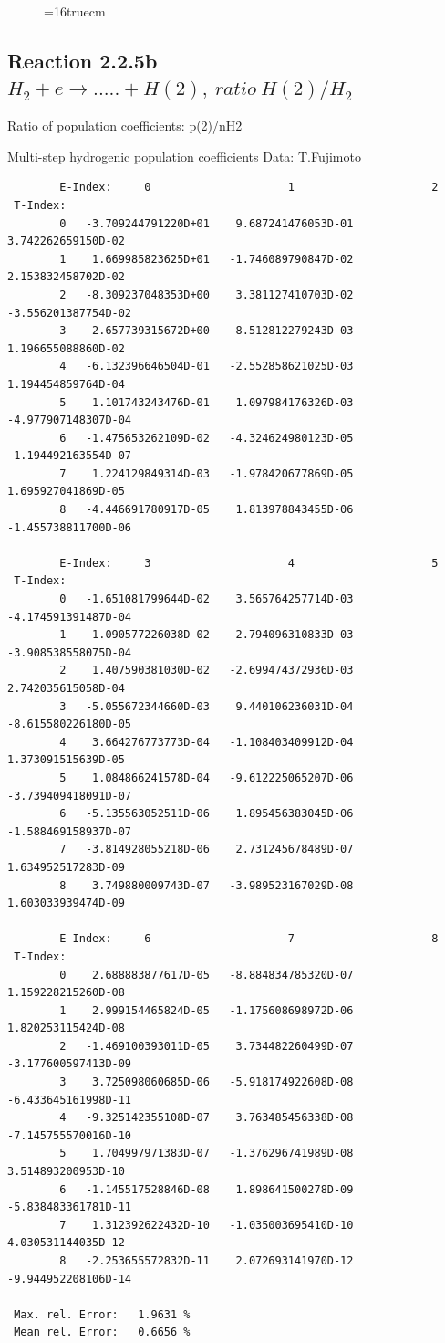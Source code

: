 \documentclass[12pt,dvips]{article}
\begin{document}
\begin{figure} \label{2.2.5a}
\epsfxsize=16truecm
\end{figure}
\newpage
\subsection{
Reaction 2.2.5b  $H_2 + e \rightarrow .....+H(2)   , \  ratio ~ H(2)/H_2 $
}

 Ratio of population coefficients: p(2)/nH2

 Multi-step hydrogenic population coefficients
 Data: T.Fujimoto


\begin{small}\begin{verbatim}
        E-Index:     0                     1                     2
 T-Index:
        0   -3.709244791220D+01    9.687241476053D-01    3.742262659150D-02
        1    1.669985823625D+01   -1.746089790847D-02    2.153832458702D-02
        2   -8.309237048353D+00    3.381127410703D-02   -3.556201387754D-02
        3    2.657739315672D+00   -8.512812279243D-03    1.196655088860D-02
        4   -6.132396646504D-01   -2.552858621025D-03    1.194454859764D-04
        5    1.101743243476D-01    1.097984176326D-03   -4.977907148307D-04
        6   -1.475653262109D-02   -4.324624980123D-05   -1.194492163554D-07
        7    1.224129849314D-03   -1.978420677869D-05    1.695927041869D-05
        8   -4.446691780917D-05    1.813978843455D-06   -1.455738811700D-06

        E-Index:     3                     4                     5
 T-Index:
        0   -1.651081799644D-02    3.565764257714D-03   -4.174591391487D-04
        1   -1.090577226038D-02    2.794096310833D-03   -3.908538558075D-04
        2    1.407590381030D-02   -2.699474372936D-03    2.742035615058D-04
        3   -5.055672344660D-03    9.440106236031D-04   -8.615580226180D-05
        4    3.664276773773D-04   -1.108403409912D-04    1.373091515639D-05
        5    1.084866241578D-04   -9.612225065207D-06   -3.739409418091D-07
        6   -5.135563052511D-06    1.895456383045D-06   -1.588469158937D-07
        7   -3.814928055218D-06    2.731245678489D-07    1.634952517283D-09
        8    3.749880009743D-07   -3.989523167029D-08    1.603033939474D-09

        E-Index:     6                     7                     8
 T-Index:
        0    2.688883877617D-05   -8.884834785320D-07    1.159228215260D-08
        1    2.999154465824D-05   -1.175608698972D-06    1.820253115424D-08
        2   -1.469100393011D-05    3.734482260499D-07   -3.177600597413D-09
        3    3.725098060685D-06   -5.918174922608D-08   -6.433645161998D-11
        4   -9.325142355108D-07    3.763485456338D-08   -7.145755570016D-10
        5    1.704997971383D-07   -1.376296741989D-08    3.514893200953D-10
        6   -1.145517528846D-08    1.898641500278D-09   -5.838483361781D-11
        7    1.312392622432D-10   -1.035003695410D-10    4.030531144035D-12
        8   -2.253655572832D-11    2.072693141970D-12   -9.944952208106D-14

 Max. rel. Error:   1.9631 %
 Mean rel. Error:   0.6656 %


\end{verbatim}\end{small}
\end{document}
